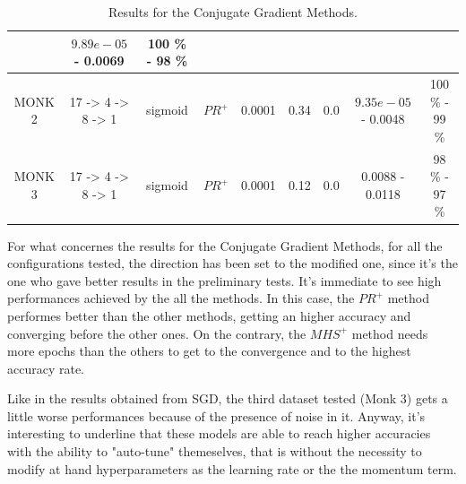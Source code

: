 \begin{table}[H]
\begin{subtable}{\textwidth}
{\begin{tabular}{| c | c | c | c | c | c | c | c | c |}
                            & $9.89e-05$ - 0.0069 & 100 \% - 98 \% \\
                            \hline
                            MONK 2 & 17 -> 4 -> 8 -> 1 & sigmoid & $PR^{+}$ & 0.0001 & 0.34 & 0.0
                            & $9.35e-05$ - 0.0048 & 100 \% - 99 \% \\
                            \hline
                            MONK 3 & 17 -> 4 -> 8 -> 1 & sigmoid & $PR^{+}$ & 0.0001 & 0.12 & 0.0
                            & 0.0088 - 0.0118 & 98 \% - 97 \% \\
                            \hline
                        \end{tabular}
                    }
                \end{subtable}
                \caption{Results for the Conjugate Gradient Methods.}
                \label{tab:monks_cgd}
        \end{table}

        For what concernes the results for the Conjugate Gradient Methods, for all the configurations tested,
        the direction has been set to the modified one, since it's the one who gave better results in the
        preliminary tests. It's immediate to see high performances achieved by the all the methods. In this case, the $PR^+$ method performes better than the other methods, getting an higher accuracy and converging before the other ones. On the contrary, the $MHS^+$ method needs more epochs than the others to get to the convergence and to the highest accuracy rate.

        Like in the results obtained from SGD, the third
        dataset tested (Monk 3) gets a little worse performances because of the presence of noise in it.
        Anyway, it's interesting to underline that these models are able to reach higher accuracies with the
        ability to "auto-tune" themeselves, that is without the necessity to modify at hand hyperparameters as the
        learning rate or the the momentum term.

